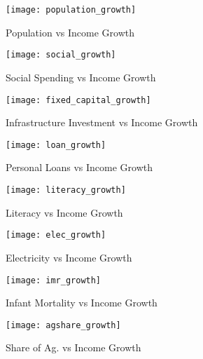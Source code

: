 \documentclass[a4paper, 11pt]{article}
\begin{document}
\begin{figure}[!hp]
    \centering
    \captionsetup{justification=centering}
    \begin{minipage}{0.45\textwidth}
        \centering
        \texttt{[image: population\_growth]} %
        \caption{Population vs Income Growth}
    \end{minipage}\hfill
    \begin{minipage}{0.45\textwidth}
        \centering
        \texttt{[image: social\_growth]} %
        \caption{Social Spending vs Income Growth}
    \end{minipage}\hfill
    \begin{minipage}{0.45\textwidth}
        \centering
        \texttt{[image: fixed\_capital\_growth]} %
        \caption{Infrastructure Investment vs  Income Growth}
    \end{minipage}\hfill
    \begin{minipage}{0.45\textwidth}
        \centering
        \texttt{[image: loan\_growth]} %
        \caption{Personal Loans vs Income Growth}
    \end{minipage}\hfill
    \begin{minipage}{0.45\textwidth}
        \centering
        \texttt{[image: literacy\_growth]} %
        \caption{Literacy vs Income Growth}
    \end{minipage}\hfill
    \begin{minipage}{0.45\textwidth}
        \centering
        \texttt{[image: elec\_growth]} %
        \caption{Electricity vs Income Growth}
    \end{minipage}\hfill
    \begin{minipage}{0.45\textwidth}
        \centering
        \texttt{[image: imr\_growth]} %
        \caption{Infant Mortality vs Income Growth}
    \end{minipage}\hfill
    \begin{minipage}{0.45\textwidth}
        \centering
        \texttt{[image: agshare\_growth]} %
        \caption{Share of Ag. vs Income Growth}
    \end{minipage}
\end{figure}

\clearpage
\end{document}
